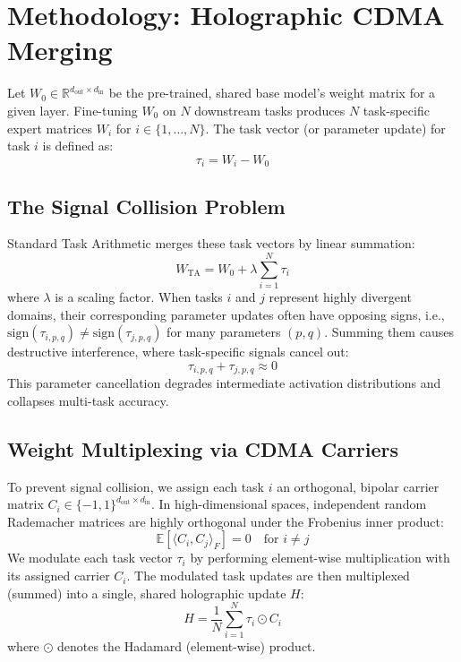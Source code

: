 \documentclass{article}
\begin{document}
\section{Methodology: Holographic CDMA Merging}
\label{sec:method}
Let $W_0 \in \mathbb{R}^{d_{\text{out}} \times d_{\text{in}}}$ be the pre-trained, shared base model's weight matrix for a given layer. Fine-tuning $W_0$ on $N$ downstream tasks produces $N$ task-specific expert matrices $W_i$ for $i \in \{1, \ldots, N\}$. The task vector (or parameter update) for task $i$ is defined as:
\begin{equation}
    \tau_i = W_i - W_0
\end{equation}

\subsection{The Signal Collision Problem}
Standard Task Arithmetic merges these task vectors by linear summation:
\begin{equation}
    W_{\text{TA}} = W_0 + \lambda \sum_{i=1}^N \tau_i
\end{equation}
where $\lambda$ is a scaling factor. When tasks $i$ and $j$ represent highly divergent domains, their corresponding parameter updates often have opposing signs, i.e., $\text{sign}(\tau_{i, p, q}) \neq \text{sign}(\tau_{j, p, q})$ for many parameters $(p, q)$. Summing them causes destructive interference, where task-specific signals cancel out:
\begin{equation}
    \tau_{i, p, q} + \tau_{j, p, q} \approx 0
\end{equation}
This parameter cancellation degrades intermediate activation distributions and collapses multi-task accuracy.

\subsection{Weight Multiplexing via CDMA Carriers}
To prevent signal collision, we assign each task $i$ an orthogonal, bipolar carrier matrix $C_i \in \{-1, 1\}^{d_{\text{out}} \times d_{\text{in}}}$. In high-dimensional spaces, independent random Rademacher matrices are highly orthogonal under the Frobenius inner product:
\begin{equation}
    \mathbb{E}[\langle C_i, C_j \rangle_F] = 0 \quad \text{for } i \neq j
\end{equation}
We modulate each task vector $\tau_i$ by performing element-wise multiplication with its assigned carrier $C_i$. The modulated task updates are then multiplexed (summed) into a single, shared holographic update $H$:
\begin{equation}
    H = \frac{1}{N} \sum_{i=1}^N \tau_i \odot C_i
\end{equation}
where $\odot$ denotes the Hadamard (element-wise) product.
\end{document}
